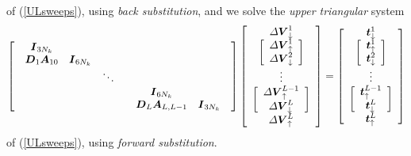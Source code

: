 of (\ref{ULsweeps}), using {\em back substitution\/}, and we solve the {\em upper triangular\/}
system 
\begin{equation} \label{Downsweep}
\left[{\begin{array}{cc}\begin{array}{ccc}{\mbox{\boldmath$\mit I$\unboldmath}}_{3 N_k}&&\\{\mbox{\boldmath$\mit D$\unboldmath}}_{1}{\mbox{\boldmath$\mit A$\unboldmath}}_{10} &{\mbox{\boldmath$\mit I$\unboldmath}}_{6 N_k}&\\&&\ddots\end{array}&\\ 
&\begin{array}{cc}
{\mbox{\boldmath$\mit I$\unboldmath}}_{6 N_k}&\\ {\mbox{\boldmath$\mit D$\unboldmath}}_{L}{\mbox{\boldmath$\mit A$\unboldmath}}_{L,L-1}&{\mbox{\boldmath$\mit I$\unboldmath}}_{3 N_k}\end{array}\end{array}}\right]
\left[{\begin{array}{c} {\mit \Delta} {  
\mbox{\boldmath$\mit V$\unboldmath}}_{\downarrow }^{  1}\\ \left[{\begin{array}{c}{\mit \Delta} {  
\mbox{\boldmath$\mit V$\unboldmath}}_{\uparrow }^{  1}\\ {\mit \Delta} {  \mbox{\boldmath$\mit V$\unboldmath}}_{\downarrow }^{  
2}\end{array}}\right]\\   \vdots\\ \left[{\begin{array}{c} 
{\mit \Delta} {  \mbox{\boldmath$\mit V$\unboldmath}}_{\uparrow }^{  L-1}\\ {\mit \Delta} {  
\mbox{\boldmath$\mit V$\unboldmath}}_{\downarrow }^{  L}\end{array}}\right]\\  {\mit \Delta} {  
\mbox{\boldmath$\mit V$\unboldmath}}_{\uparrow }^{  L}\end{array}}\right]
=
\left[{\begin{array}{c}
{\mbox{\boldmath$\mit t$\unboldmath}}_{ \downarrow }^{1}\\
\left[{\begin{array}{c}
{\mbox{\boldmath$\mit t$\unboldmath}}_{ \uparrow }^{1}\\
{\mbox{\boldmath$\mit t$\unboldmath}}_{ \downarrow }^{2}\end{array}}\right]\\
\vdots\\
\left[{\begin{array}{c}
{\mbox{\boldmath$\mit t$\unboldmath}}_{ \uparrow }^{L-1}\\
{\mbox{\boldmath$\mit t$\unboldmath}}_{ \downarrow }^{L}\end{array}}\right]\\
{\mbox{\boldmath$\mit t$\unboldmath}}_{ \uparrow }^{L}\end{array}}\right]
\end{equation}
of (\ref{ULsweeps}), using {\em forward substitution\/}.
